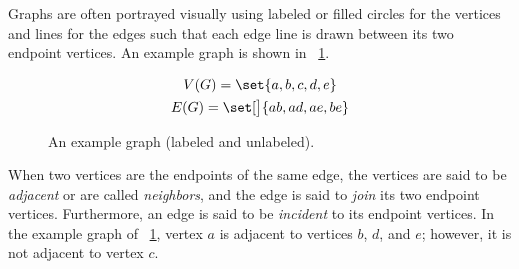 Graphs are often portrayed visually using labeled or filled circles for the vertices and lines for the edges such
that each edge line is drawn between its two endpoint vertices.  An example graph is shown in
\figurename~\ref{fig:exgraph}.

\begin{figure}[H]
  \begin{minipage}{3in}
    \vspace{0in}
    \centering
  \end{minipage}
  \begin{minipage}{3in}
    \vspace{0in}
    \centering
  \end{minipage}
  \begin{gather*}
    V(G)=\set{a,b,c,d,e} \\
    E(G)=\set[\big]{ab,ad,ae,be}
  \end{gather*}
  \vspace{-2\baselineskip}
  \caption{An example graph (labeled and unlabeled).}
  \label{fig:exgraph}
\end{figure}

When two vertices are the endpoints of the same edge, the vertices are said to be \emph{adjacent} or are called
\emph{neighbors}, and the edge is said to \emph{join} its two endpoint vertices.  Furthermore, an edge is said to
be \emph{incident} to its endpoint vertices.  In the example graph of \figurename~\ref{fig:exgraph}, vertex \(a\)
is adjacent to vertices \(b\), \(d\), and \(e\); however, it is not adjacent to vertex \(c\).

